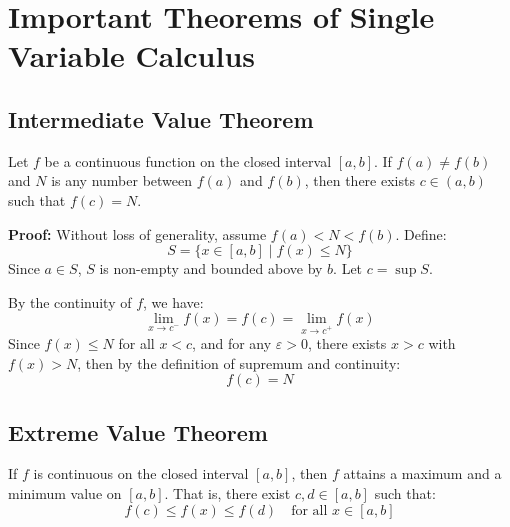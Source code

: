 \section{Important Theorems of Single Variable Calculus}

\subsection{Intermediate Value Theorem}

Let \( f \) be a continuous function on the closed interval \([a, b]\). If \( f(a) \ne f(b) \) and \( N \) is any number between \( f(a) \) and \( f(b) \), then there exists \( c \in (a, b) \) such that \( f(c) = N \).

\textbf{Proof:}  
Without loss of generality, assume \( f(a) < N < f(b) \).  
Define:
\[
S = \{ x \in [a, b] \mid f(x) \le N \}
\]
Since \( a \in S \), \( S \) is non-empty and bounded above by \( b \). Let \( c = \sup S \).

By the continuity of \( f \), we have:
\[
\lim_{x \to c^-} f(x) = f(c) = \lim_{x \to c^+} f(x)
\]
Since \( f(x) \le N \) for all \( x < c \), and for any \( \varepsilon > 0 \), there exists \( x > c \) with \( f(x) > N \), then by the definition of supremum and continuity:
\[
f(c) = N
\]

\QED

\begin{center}
\end{center}

\subsection{Extreme Value Theorem}

If \( f \) is continuous on the closed interval \([a, b] \), then \( f \) attains a maximum and a minimum value on \([a, b]\).  
That is, there exist \( c, d \in [a, b] \) such that:
\[
f(c) \le f(x) \le f(d) \quad \text{for all } x \in [a, b]
\]

